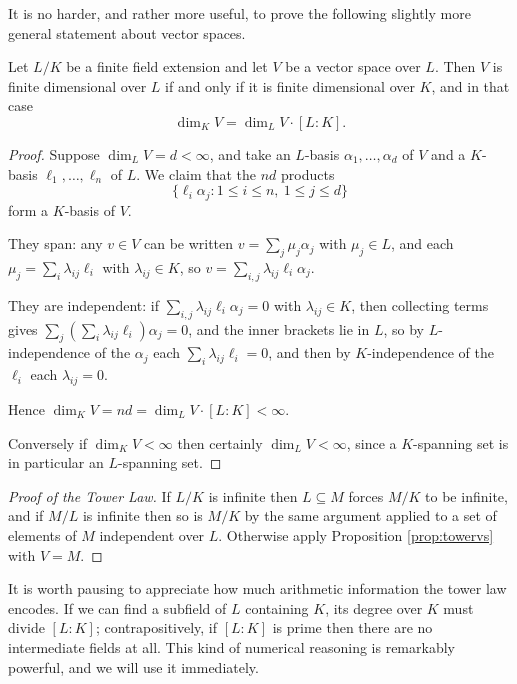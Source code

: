 It is no harder, and rather more useful, to prove the following slightly more general statement about vector spaces.

\begin{proposition}\label{prop:towervs}
	Let $L/K$ be a finite field extension and let $V$ be a vector space over $L$. Then $V$ is finite dimensional over $L$ if and only if it is finite dimensional over $K$, and in that case
	$$\dim_K V = \dim_L V \cdot [L : K].$$
\end{proposition}

\begin{proof}
	Suppose $\dim_L V = d < \infty$, and take an $L$-basis $\alpha_1, \dots, \alpha_d$ of $V$ and a $K$-basis $\ell_1, \dots, \ell_n$ of $L$. We claim that the $nd$ products
	$$\{\ell_i \alpha_j : 1 \leq i \leq n,\ 1 \leq j \leq d\}$$
	form a $K$-basis of $V$.

	They span: any $v \in V$ can be written $v = \sum_{j} \mu_j \alpha_j$ with $\mu_j \in L$, and each $\mu_j = \sum_i \lambda_{ij} \ell_i$ with $\lambda_{ij} \in K$, so $v = \sum_{i,j} \lambda_{ij} \ell_i \alpha_j$.

	They are independent: if $\sum_{i,j} \lambda_{ij} \ell_i \alpha_j = 0$ with $\lambda_{ij} \in K$, then collecting terms gives $\sum_j \left( \sum_i \lambda_{ij}\ell_i \right)\alpha_j = 0$, and the inner brackets lie in $L$, so by $L$-independence of the $\alpha_j$ each $\sum_i \lambda_{ij} \ell_i = 0$, and then by $K$-independence of the $\ell_i$ each $\lambda_{ij} = 0$.

	Hence $\dim_K V = nd = \dim_L V \cdot [L:K] < \infty$.

	Conversely if $\dim_K V < \infty$ then certainly $\dim_L V < \infty$, since a $K$-spanning set is in particular an $L$-spanning set.
\end{proof}

\begin{proof}[Proof of the Tower Law]
	If $L/K$ is infinite then $L \subseteq M$ forces $M/K$ to be infinite, and if $M/L$ is infinite then so is $M/K$ by the same argument applied to a set of elements of $M$ independent over $L$. Otherwise apply Proposition \ref{prop:towervs} with $V = M$.
\end{proof}

It is worth pausing to appreciate how much arithmetic information the tower law encodes. If we can find a subfield of $L$ containing $K$, its degree over $K$ must divide $[L:K]$; contrapositively, if $[L:K]$ is prime then there are no intermediate fields at all. This kind of numerical reasoning is remarkably powerful, and we will use it immediately.


